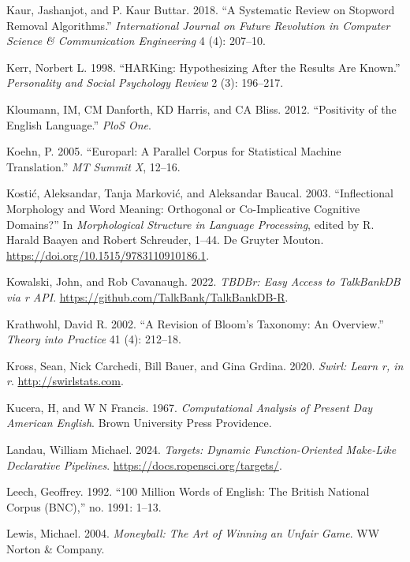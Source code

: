 \documentclass[
  letterpaper,
  DIV=11,
  numbers=noendperiod]{scrreprt}
\newlength{\cslhangindent}
\newenvironment{CSLReferences}[2] %
 {\begin{list}{}{%
  \setlength{\itemindent}{0pt}
  \setlength{\leftmargin}{0pt}
  \setlength{\parsep}{0pt}
  \ifodd #1
   \setlength{\leftmargin}{\cslhangindent}
   \setlength{\itemindent}{-1\cslhangindent}
  \fi
  \setlength{\itemsep}{#2\baselineskip}}}
 {\end{list}}
\theoremstyle{definition}
\theoremstyle{remark}
\begin{document}
\begin{CSLReferences}{1}{0}
Kaur, Jashanjot, and P. Kaur Buttar. 2018. {``A Systematic Review on
Stopword Removal Algorithms.''} \emph{International Journal on Future
Revolution in Computer Science \& Communication Engineering} 4 (4):
207--10.

Kerr, Norbert L. 1998. {``HARKing: Hypothesizing After the Results Are
Known.''} \emph{Personality and Social Psychology Review} 2 (3):
196--217.

Kloumann, IM, CM Danforth, KD Harris, and CA Bliss. 2012. {``Positivity
of the English Language.''} \emph{PloS One}.

Koehn, P. 2005. {``Europarl: A Parallel Corpus for Statistical Machine
Translation.''} \emph{MT Summit X}, 12--16.

Kostić, Aleksandar, Tanja Marković, and Aleksandar Baucal. 2003.
{``Inflectional Morphology and Word Meaning: Orthogonal or
Co-Implicative Cognitive Domains?''} In \emph{Morphological Structure in
Language Processing}, edited by R. Harald Baayen and Robert Schreuder,
1--44. De Gruyter Mouton. \url{https://doi.org/10.1515/9783110910186.1}.

Kowalski, John, and Rob Cavanaugh. 2022. \emph{TBDBr: Easy Access to
TalkBankDB via r API}. \url{https://github.com/TalkBank/TalkBankDB-R}.

Krathwohl, David R. 2002. {``A Revision of Bloom's Taxonomy: An
Overview.''} \emph{Theory into Practice} 41 (4): 212--18.

Kross, Sean, Nick Carchedi, Bill Bauer, and Gina Grdina. 2020.
\emph{Swirl: Learn r, in r}. \url{http://swirlstats.com}.

Kucera, H, and W N Francis. 1967. \emph{Computational Analysis of
Present Day American English}. Brown University Press Providence.

Landau, William Michael. 2024. \emph{Targets: Dynamic Function-Oriented
Make-Like Declarative Pipelines}.
\url{https://docs.ropensci.org/targets/}.

Leech, Geoffrey. 1992. {``100 Million Words of English: The British
National Corpus (BNC),''} no. 1991: 1--13.

Lewis, Michael. 2004. \emph{Moneyball: The Art of Winning an Unfair
Game}. WW Norton \& Company.


\end{CSLReferences}
\end{document}
